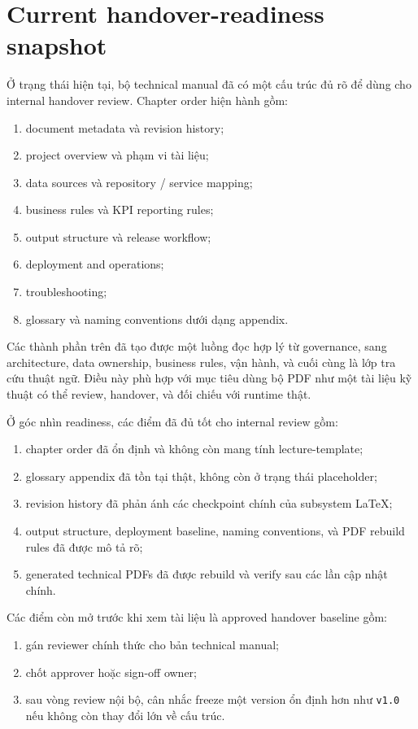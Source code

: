 \section{Current handover-readiness snapshot}

Ở trạng thái hiện tại, bộ technical manual đã có một cấu trúc đủ rõ để dùng cho internal handover review. Chapter order hiện hành gồm:

\begin{enumerate}[label=-]
\item document metadata và revision history;
\item project overview và phạm vi tài liệu;
\item data sources và repository / service mapping;
\item business rules và KPI reporting rules;
\item output structure và release workflow;
\item deployment and operations;
\item troubleshooting;
\item glossary và naming conventions dưới dạng appendix.
\end{enumerate}

Các thành phần trên đã tạo được một luồng đọc hợp lý từ governance, sang architecture, data ownership, business rules, vận hành, và cuối cùng là lớp tra cứu thuật ngữ. Điều này phù hợp với mục tiêu dùng bộ PDF như một tài liệu kỹ thuật có thể review, handover, và đối chiếu với runtime thật.

Ở góc nhìn readiness, các điểm đã đủ tốt cho internal review gồm:

\begin{enumerate}[label=-]
\item chapter order đã ổn định và không còn mang tính lecture-template;
\item glossary appendix đã tồn tại thật, không còn ở trạng thái placeholder;
\item revision history đã phản ánh các checkpoint chính của subsystem LaTeX;
\item output structure, deployment baseline, naming conventions, và PDF rebuild rules đã được mô tả rõ;
\item generated technical PDFs đã được rebuild và verify sau các lần cập nhật chính.
\end{enumerate}

Các điểm còn mở trước khi xem tài liệu là approved handover baseline gồm:

\begin{enumerate}[label=-]
\item gán reviewer chính thức cho bản technical manual;
\item chốt approver hoặc sign-off owner;
\item sau vòng review nội bộ, cân nhắc freeze một version ổn định hơn như \texttt{v1.0} nếu không còn thay đổi lớn về cấu trúc.
\end{enumerate}


